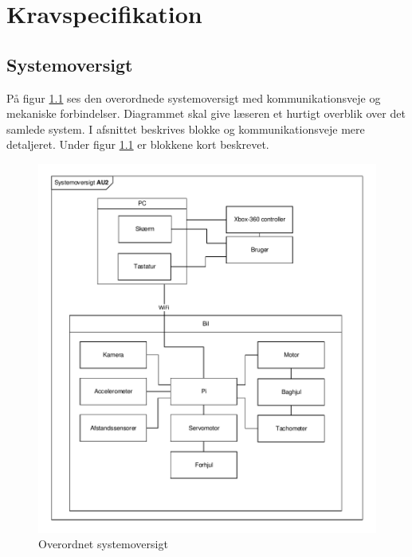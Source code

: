 \chapter{Kravspecifikation} \label{ch:kravspecifikation}



\section{Systemoversigt} \label{sec:systemoversigt}
På figur \ref{fig:systemoversigt} ses den overordnede systemoversigt med kommunikationsveje og mekaniske forbindelser. Diagrammet skal give læseren et hurtigt overblik over det samlede system. I afsnittet %
beskrives blokke og kommunikationsveje mere detaljeret. Under figur \ref{fig:systemoversigt} er blokkene kort beskrevet. 

\begin{figure}[h]
\centering
\includegraphics[scale=0.9]{../fig/diagrammer/systemoversigt.pdf}
\caption{Overordnet systemoversigt}
\label{fig:systemoversigt}
\end{figure}
\clearpage

